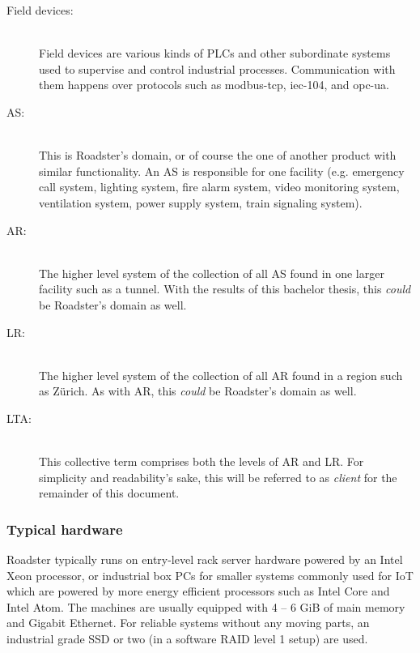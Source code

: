 \begin{description}
	\item [ Field devices: ] \hfill\\
	Field devices are various kinds of \glspl{PLC} and other subordinate systems
	used to supervise and control industrial processes. Communication with them
	happens over protocols such as \gls{modbus-tcp}, \gls{iec-104}, and
	\gls{opc-ua}.

	\item [ \gls{AS}: ] \hfill\\
	This is Roadster's domain, or of course the one of another product with similar
	functionality. An AS is responsible for one facility (e.g. emergency call system,
	lighting system, fire alarm system, video monitoring system, ventilation
	system, power supply system, train signaling system).

	\item [ \gls{AR}: ] \hfill\\
	The higher level system of the collection of all AS found in one larger
	facility such as a tunnel. With the results of this bachelor thesis, this
	\emph{could} be Roadster's domain as well.

	\item [ \gls{LR}: ] \hfill\\
	The higher level system of the collection of all AR found in a region such as
	Z\"urich. As with AR, this \emph{could} be Roadster's domain as well.

	\item [ \gls{LTA}: ] \hfill\\
	This collective term comprises both the levels of AR and LR. For
	simplicity and readability's sake, this will be referred to as
	\emph{client} for the remainder of this document.
\end{description}

\subsubsection{Typical hardware}
Roadster typically runs on entry-level rack server hardware powered by an
Intel\textregistered{} Xeon\textregistered{} processor, or industrial box PCs for smaller systems
commonly used for \gls{IoT} which are powered by more energy efficient processors
such as Intel\textregistered{} Core\textregistered{} and Intel\textregistered{}
Atom\texttrademark{}. The machines are usually equipped with 4 -- 6 GiB of main
memory and Gigabit Ethernet. For reliable systems without any moving parts, an
industrial grade \gls{SSD} or two (in a software \gls{RAID} level 1 setup) are used.


